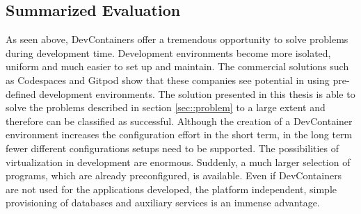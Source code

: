     \subsection{Summarized Evaluation}
    As seen above, DevContainers offer a tremendous opportunity to solve problems during development time. Development environments become more isolated, uniform and much easier to set up and maintain. The commercial solutions such as Codespaces and Gitpod show that these companies see potential in using pre-defined development environments.\newline
    The solution presented in this thesis is able to solve the problems described in section \ref{sec::problem} to a large extent and therefore can be classified as successful. Although the creation of a DevContainer environment increases the configuration effort in the short term, in the long term fewer different configurations setups need to be supported. \newline
    The possibilities of virtualization in development are enormous. Suddenly, a much larger selection of programs, which are already preconfigured, is available. Even if DevContainers are not used for the applications developed, the platform independent, simple provisioning of databases and auxiliary services is an immense advantage.
